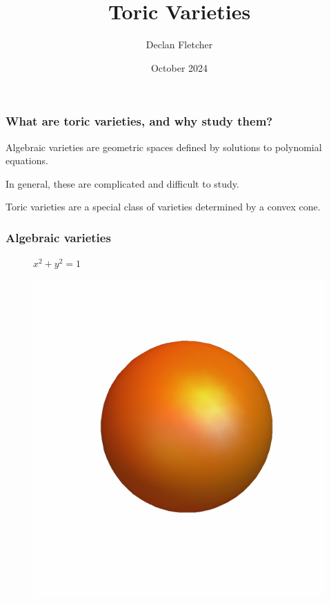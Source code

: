\documentclass[handout]{beamer}
\title{Toric Varieties}
\author{Declan Fletcher}
\date{October 2024}
\theoremstyle{definition}
\theoremstyle{definition}
\begin{document}
\begin{frame}
\titlepage
\end{frame}

\begin{frame}
\frametitle{What are toric varieties, and why study them?}
\pause
Algebraic varieties are geometric spaces defined by solutions to \alert{polynomial equations}.

\pause
In general, these are complicated and difficult to study.

\pause
\alert{Toric varieties} are a special class of varieties determined by a \alert{convex cone}.
\end{frame}

\begin{frame}
\frametitle{Algebraic varieties}
\centering
\begin{minipage}[t]{0.49\textwidth}
\centering
\begin{figure}
\vspace{0.05cm}
\caption*{$x^2+y^2=1$}
\end{figure}
\end{minipage}
\hfill
\begin{minipage}[t]{0.49\textwidth}
    \centering
\vspace{-1cm}
\begin{figure}
    \includegraphics[width=0.75\linewidth]{orange_sphere}

\end{figure}
\end{minipage}
\end{frame}
\end{document}
